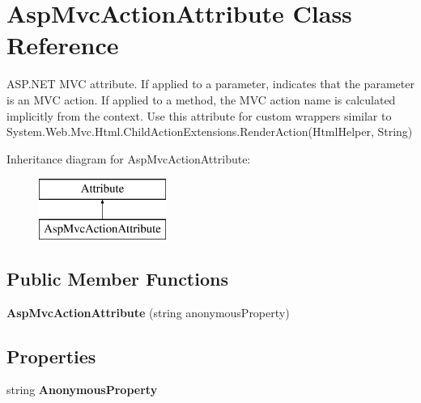 \hypertarget{class_asp_mvc_action_attribute}{}\section{Asp\+Mvc\+Action\+Attribute Class Reference}
\label{class_asp_mvc_action_attribute}


A\+S\+P.\+N\+E\+T M\+V\+C attribute. If applied to a parameter, indicates that the parameter is an M\+V\+C action. If applied to a method, the M\+V\+C action name is calculated implicitly from the context. Use this attribute for custom wrappers similar to {\ttfamily System.\+Web.\+Mvc.\+Html.\+Child\+Action\+Extensions.\+Render\+Action(\+Html\+Helper, String)}  


Inheritance diagram for Asp\+Mvc\+Action\+Attribute\+:\begin{figure}[H]
\begin{center}
\leavevmode
\includegraphics[height=2.000000cm]{class_asp_mvc_action_attribute}
\end{center}
\end{figure}
\subsection*{Public Member Functions}
\begin{DoxyCompactItemize}
\item 
\hypertarget{class_asp_mvc_action_attribute_a2f39095bf0a497897fbbc76e96621ff0}{}{\bfseries Asp\+Mvc\+Action\+Attribute} (string anonymous\+Property)\label{class_asp_mvc_action_attribute_a2f39095bf0a497897fbbc76e96621ff0}

\end{DoxyCompactItemize}
\subsection*{Properties}
\begin{DoxyCompactItemize}
\item 
\hypertarget{class_asp_mvc_action_attribute_a7068fa64becd1bc3de4622e5a50b0a49}{}string {\bfseries Anonymous\+Property}\label{class_asp_mvc_action_attribute_a7068fa64becd1bc3de4622e5a50b0a49}

\end{DoxyCompactItemize}


